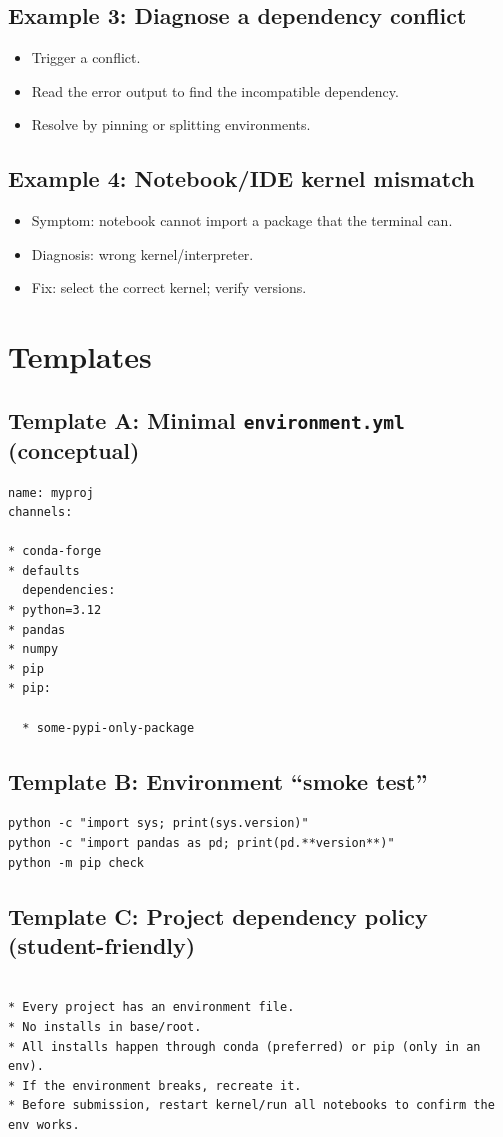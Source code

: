 \subsection{Example 3: Diagnose a dependency conflict}
\begin{itemize}
\item Trigger a conflict.
\item Read the error output to find the incompatible dependency.
\item Resolve by pinning or splitting environments.
\end{itemize}

\subsection{Example 4: Notebook/IDE kernel mismatch}
\begin{itemize}
\item Symptom: notebook cannot import a package that the terminal can.
\item Diagnosis: wrong kernel/interpreter.
\item Fix: select the correct kernel; verify versions.
\end{itemize}

\section{Templates}
\subsection{Template A: Minimal \texttt{environment.yml} (conceptual)}
\begin{verbatim}
name: myproj
channels:

* conda-forge
* defaults
  dependencies:
* python=3.12
* pandas
* numpy
* pip
* pip:

  * some-pypi-only-package
    \end{verbatim}

\subsection{Template B: Environment ``smoke test''}
\begin{verbatim}
python -c "import sys; print(sys.version)"
python -c "import pandas as pd; print(pd.**version**)"
python -m pip check
\end{verbatim}

\subsection{Template C: Project dependency policy (student-friendly)}
\begin{verbatim}

* Every project has an environment file.
* No installs in base/root.
* All installs happen through conda (preferred) or pip (only in an env).
* If the environment breaks, recreate it.
* Before submission, restart kernel/run all notebooks to confirm the env works.
  \end{verbatim}

